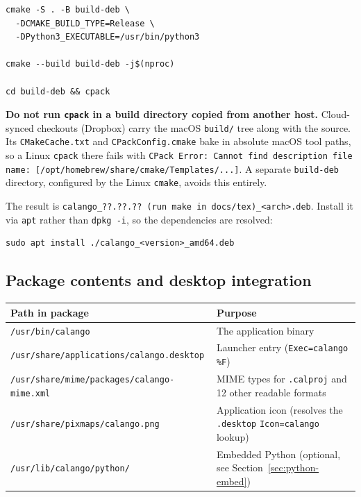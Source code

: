 \documentclass[11pt,a4paper]{article}
\newcommand{\file}[1]{\texttt{#1}}
\newcommand{\opt}[1]{\texttt{#1}}
\newcommand{\calangoversion}{??.??.?? (run make in docs/tex)}%
\begin{document}
\begin{lstlisting}
cmake -S . -B build-deb \
  -DCMAKE_BUILD_TYPE=Release \
  -DPython3_EXECUTABLE=/usr/bin/python3

cmake --build build-deb -j$(nproc)

cd build-deb && cpack
\end{lstlisting}

\noindent\textbf{Do not run \opt{cpack} in a build directory copied from
another host.} Cloud-synced checkouts (Dropbox) carry the macOS
\file{build/} tree along with the source. Its \file{CMakeCache.txt} and
\file{CPackConfig.cmake} bake in absolute macOS tool paths, so a Linux
\opt{cpack} there fails with \texttt{CPack Error: Cannot find
description file name: [/opt/homebrew/share/cmake/Templates/...]}. A
separate \file{build-deb} directory, configured by the Linux \file{cmake},
avoids this entirely.

The result is \file{calango\_\calangoversion\_<arch>.deb}. Install it via
\opt{apt} rather than \opt{dpkg -i}, so the dependencies are resolved:

\begin{lstlisting}
sudo apt install ./calango_<version>_amd64.deb
\end{lstlisting}

\subsection{Package contents and desktop integration}

\begin{center}
\small
\begin{tabular}{@{}lp{}@{}}
\toprule
Path in package & Purpose \\
\midrule
\file{/usr/bin/calango} & The application binary \\
\file{/usr/share/applications/calango.desktop} & Launcher entry
(\texttt{Exec=calango \%F}) \\
\file{/usr/share/mime/packages/calango-mime.xml} & MIME types for
\file{.calproj} and 12 other readable formats \\
\file{/usr/share/pixmaps/calango.png} & Application icon (resolves the
\file{.desktop} \texttt{Icon=calango} lookup) \\
\file{/usr/lib/calango/python/} & Embedded Python (optional, see
Section~\ref{sec:python-embed}) \\
\bottomrule
\end{tabular}
\end{center}
\end{document}
